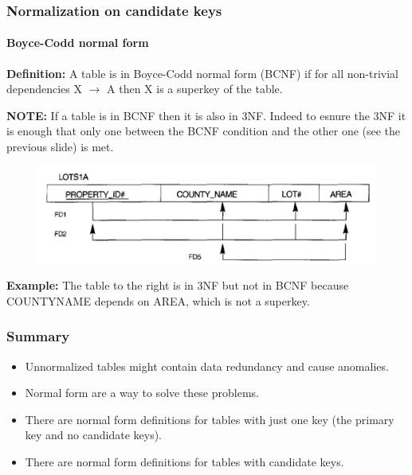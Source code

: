 \documentclass{beamer}
\newcommand{\fdep}[2]{#1 $\rightarrow$ #2}
\begin{document}
\begin{frame}
	\frametitle{Normalization on candidate keys}
	\framesubtitle{Boyce-Codd normal form}
	
	\textbf{Definition:} A table is in Boyce-Codd normal form (BCNF) if for all non-trivial dependencies \fdep{X}{A} then X is a superkey of the table.
	
	\textbf{NOTE:} If a table is in BCNF then it is also in 3NF. Indeed to esnure the 3NF it is enough that only one between the BCNF condition and the other one (see the previous slide) is met.
	
	\begin{figure}
		\begin{center}
			\includegraphics[scale=0.4]{img/normalization/norm13b}
		\end{center}
	\end{figure}
	
	\textbf{Example:} The table to the right is in 3NF but not in BCNF because COUNTY\textunderscore NAME depends on AREA, which is not a superkey.
	
\end{frame}


\begin{frame}
	\frametitle{Summary}
	\begin{itemize}
		\item Unnormalized tables might contain data redundancy and cause anomalies.
		\item Normal form are a way to solve these problems.
		\item There are normal form definitions for tables with just one key (the primary key and no candidate keys).
		\item There are normal form definitions for tables with candidate keys.
	\end{itemize}
\end{frame}
\end{document}
